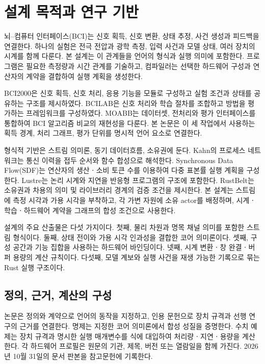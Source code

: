 \section{설계 목적과 연구 기반}
\label{sec:introduction}
뇌--컴퓨터 인터페이스(BCI)는 신호 획득, 신호 변환, 상태 추정, 사건 생성과 피드백을 연결한다.
하나의 실험은 전극 전압과 광학 측정, 입력 사건과 모델 상태, 여러 장치의 시계를 함께 다룬다.
본 설계는 이 관계들을 언어의 형식과 실행 의미에 포함한다. 프로그램은 필요한 측정량과
시간 관계를 기술하고, 컴파일러는 선택한 하드웨어 구성과 연산자의 계약을 결합하여 실행 계획을 생성한다.

BCI2000은 신호 획득, 신호 처리, 응용 기능을 모듈로 구성하고 실험 조건과 상태를 공유하는
구조를 제시하였다\cite{bci2000}. BCILAB은 신호 처리와 학습 절차를 조합하고 방법을 평가하는
프레임워크를 구성하였다\cite{bcilab}. MOABB는 데이터셋, 전처리와 평가 인터페이스를 통합하여
BCI 알고리즘 비교의 재현성을 다룬다\cite{moabb}. 본 논문은 이 세 작업에서 사용하는
획득 경계, 처리 그래프, 평가 단위를 명시적 언어 요소로 연결한다.

형식적 기반은 스트림 의미론, 동기 데이터흐름, 소유권에 둔다. Kahn의 프로세스 네트워크는
통신 이력을 접두 순서와 함수 합성으로 해석한다\cite{kahn}. Synchronous Data Flow(SDF)는
연산자의 생산ㆍ소비 토큰 수를 이용하여 다중 표본률 실행 계획을 구성한다\cite{sdf}.
Lustre는 논리 시계와 지연을 반응형 프로그램의 구조에 포함한다\cite{lustre}.
RustBelt는 소유권과 차용의 의미 및 라이브러리 경계의 검증 조건을 제시한다\cite{rustbelt}.
본 설계는 스트림에 측정 시각과 가용 시각을 부착하고, 각 가변 자원에 소유 actor를 배정하며,
시계ㆍ학습ㆍ하드웨어 계약을 그래프의 합성 조건으로 사용한다.

설계의 주요 산출물은 다섯 가지이다. 첫째, 물리 차원과 명목 채널 의미를 포함한 스트림 형식이다.
둘째, 상태 전이와 가용 시각 인과성을 결합한 코어 의미론이다. 셋째, 구성 공간과 기능 집합을
사용하는 하드웨어 바인딩이다. 넷째, 시계 변환ㆍ창 완결ㆍ버퍼 용량의 계산 규칙이다.
다섯째, 모델 계보와 실행 사건을 재생 가능한 기록으로 묶는 Rust 실행 구조이다.

\subsection{정의, 근거, 계산의 구성}
논문은 정의와 계약으로 언어의 동작을 지정하고, 인용 문헌으로 장치 규격과 선행 연구의
근거를 연결한다. 명제는 지정한 코어 의미론에서 합성 성질을 증명한다. 수치 예제는
장치 규격과 명시한 실행 매개변수를 식에 대입하여 처리량ㆍ지연ㆍ용량을 계산한다.
각 하드웨어 프로필은 원문의 기관, 제목, 버전 또는 열람일을 함께 가진다.
2026년 10월 31일의 문서 판본을 참고문헌에 기록한다.


